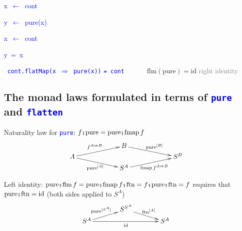 \texttt{\textcolor{blue}{\footnotesize{}}}%
\begin{minipage}[c][1\totalheight][t]{0.49\columnwidth}%
\begin{lyxcode}
\textcolor{blue}{\footnotesize{}x~$\leftarrow$~cont}{\footnotesize\par}

\textcolor{blue}{\footnotesize{}y~$\leftarrow$~pure(x)}{\footnotesize\par}
\end{lyxcode}
%
\end{minipage}\texttt{\textcolor{blue}{\footnotesize{}\hfill{}}}%
\begin{minipage}[c][1\totalheight][t]{0.49\columnwidth}%
\begin{lyxcode}
\textcolor{blue}{\footnotesize{}x~$\leftarrow$~cont}{\footnotesize\par}

\textcolor{blue}{\footnotesize{}y~=~x}{\footnotesize\par}
\end{lyxcode}
%
\end{minipage}\texttt{\textcolor{blue}{\footnotesize{}\hfill{}\medskip{}
cont.flatMap(x $\Rightarrow$ pure(x))}} \texttt{\textcolor{blue}{\footnotesize{}=
cont}} $\quad\quad\quad\text{flm}\left(\text{pure}\right)=\text{id}$
\textcolor{gray}{\textendash{} right identity}


\subsection{The monad laws formulated in terms of \texttt{\textcolor{blue}{\footnotesize{}pure}}
and \texttt{\textcolor{blue}{\footnotesize{}flatten}} }

Naturality law for \texttt{\textcolor{blue}{\footnotesize{}pure}}:
$f\bef\text{pure}=\text{pure}\bef\text{fmap}\,f$
\[
\xymatrix{\xyScaleY{0.2pc}\xyScaleX{5pc} & B\ar[rd]\sp(0.5){\ \text{pure}^{\left[B\right]}}\\
A\ar[ru]\sp(0.5){f^{A\Rightarrow B}\ }\ar[rd]\sb(0.5){\text{pure}^{[A]}\,} &  & S^{B}\\
 & S^{A}\ar[ru]\sb(0.5){\text{fmap}\,f^{A\Rightarrow B}}
}
\]

Left identity: $\text{pure}\bef\text{flm}\,f=\text{pure}\bef\text{fmap}\,f\bef\text{ftn}=f\bef\text{pure}\bef\text{ftn}=f$
requires that $\text{pure}\bef\text{ftn}=\text{id}$ (both sides applied
to $S^{A}$)
\[
\xymatrix{\xyScaleY{0.2pc}\xyScaleX{3pc} & S^{S^{A}}\ar[rd]\sp(0.5){\ \text{ftn}^{[A]}\ }\\
S^{A}\ar[ru]\sp(0.5){\text{pure}^{[S^{A}]}\ }\ar[rr]\sb(0.5){\text{id}} &  & S^{A}
}
\]


